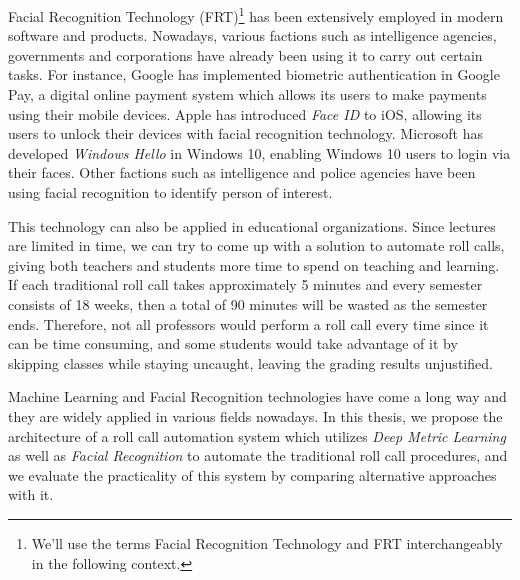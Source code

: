 Facial Recognition Technology (FRT)\footnote{We'll use the terms Facial Recognition Technology and FRT interchangeably in the following context.}
has been extensively employed in modern software and products. Nowadays, various factions such as intelligence agencies, governments
and corporations have already been using it to carry out certain tasks. For instance, Google has implemented biometric authentication
in Google Pay, a digital online payment system which allows its users to make payments using their mobile devices.
Apple has introduced \emph{Face ID} to iOS, allowing its users to unlock their devices with facial recognition technology.
Microsoft has developed \emph{Windows Hello} in Windows 10, enabling Windows 10 users to login via their faces.
Other factions such as intelligence and police agencies have been using facial recognition to identify person of interest.
\vspace{0.3cm}

This technology can also be applied in educational organizations. Since lectures are limited in time, we can try to come up
with a solution to automate roll calls, giving both teachers and students more time to spend on teaching and learning.
If each traditional roll call takes approximately 5 minutes and every semester consists of 18 weeks, then a total of 90 minutes
will be wasted as the semester ends. Therefore, not all professors would perform a roll call every time since it can be time consuming,
and some students would take advantage of it by skipping classes while staying uncaught, leaving the grading results unjustified.
\vspace{0.3cm}

Machine Learning and Facial Recognition technologies have come a long way and they are widely applied in various fields nowadays.
In this thesis, we propose the architecture of a roll call automation system which utilizes \emph{Deep Metric Learning} as well as
\emph{Facial Recognition} to automate the traditional roll call procedures, and we evaluate the practicality of this system 
by comparing alternative approaches with it.




